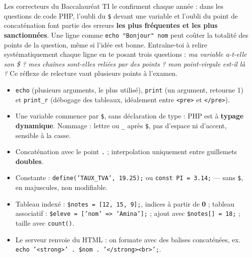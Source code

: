 \documentclass[11pt]{article}
\begin{document}
\begin{savaistu}
Les correcteurs du Baccalauréat TI le confirment chaque année : dans les questions de code PHP, l'oubli du \texttt{\$} devant une variable et l'oubli du point de concaténation font partie des erreurs \textbf{les plus fréquentes et les plus sanctionnées}. Une ligne comme \texttt{echo "Bonjour" nom} peut coûter la totalité des points de la question, même si l'idée est bonne. Entraîne-toi à relire systématiquement chaque ligne en te posant trois questions : \emph{ma variable a-t-elle son \$ ? mes chaînes sont-elles reliées par des points ? mon point-virgule est-il là ?} Ce réflexe de relecture vaut plusieurs points à l'examen.
\end{savaistu}

\begin{aretenir}
\begin{itemize}
\item \texttt{echo} (plusieurs arguments, le plus utilisé), \texttt{print} (un argument, retourne 1) et \texttt{print\_r} (débogage des tableaux, idéalement entre \texttt{<pre>} et \texttt{</pre>}).
\item Une variable commence par \texttt{\$}, sans déclaration de type : PHP est à \textbf{typage dynamique}. Nommage : lettre ou \texttt{\_} après \texttt{\$}, pas d'espace ni d'accent, sensible à la casse.
\item Concaténation avec le point \texttt{.} ; interpolation uniquement entre guillemets \textbf{doubles}.
\item Constante : \texttt{define('TAUX\_TVA', 19.25);} ou \texttt{const PI = 3.14;} — sans \texttt{\$}, en majuscules, non modifiable.
\item Tableau indexé : \texttt{\$notes = [12, 15, 9];}, indices à partir de \textbf{0} ; tableau associatif : \texttt{\$eleve = ['nom' => 'Amina'];} ; ajout avec \texttt{\$notes[] = 18;} ; taille avec \texttt{count()}.
\item Le serveur renvoie du HTML : on formate avec des balises concaténées, ex. \texttt{echo '<strong>' . \$nom . '</strong><br>';}.
\end{itemize}
\end{aretenir}
\end{document}
